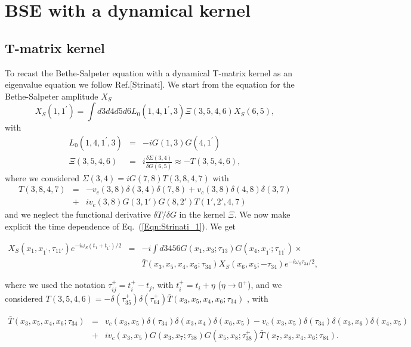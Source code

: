 \documentclass[a4paper,superscriptaddress,twocolumn,aps,prb,floatfix,citeautoscript]{revtex4-1}\usepackage[utf8]{inputenc}
\newcommand{\bea}{\begin{eqnarray}}
\newcommand{\eea}{\end{eqnarray}}
\begin{document}
\section{BSE with a dynamical  kernel}
\subsection{T-matrix kernel}
To recast the Bethe-Salpeter equation with a dynamical T-matrix kernel as an eigenvalue equation we follow Ref.[Strinati]. We start from the equation for the Bethe-Salpeter amplitude $X_S$
\begin{equation}
X_S(1,1^\prime)=\int d3d4d5d6L_0(1,4,1^\prime,3)\Xi(3,5,4,6) X_S(6,5),
\label{Eqn:Strinati_1}
\end{equation}
with 
\bea
L_0(1,4,1^\prime,3)&=&-iG(1,3)G(4,1^\prime)\\
\Xi(3,5,4,6)&=&i\frac{\delta \Sigma(3,4)}{\delta G(6,5)}\approx -T(3,5,4,6),
\label{Eqn:T-matrix_kernel}
\eea
where we considered $\Sigma(3,4)=iG(7,8)T(3,8,4,7)$  \cite{Lucia_book,pina_PRB2012}with
\bea
T(3,8,4,7) &=&-v_c(3,8)\delta(3,4)\delta(7,8)+v_c(3,8)\delta(4,8)\delta(3,7)\nonumber\\
&+&iv_c(3,8)G(3,1')G(8,2')T(1',2',4,7)
\label{Eqn:T-matrix}
\eea
and we neglect the functional derivative $\delta T/\delta G$ in the kernel $\Xi$.
We now make explicit the time dependence of Eq.\ (\ref{Eqn:Strinati_1}). We get 
\begin{widetext}
\begin{eqnarray}
  X_S(x_1,x_{1^\prime},\tau_{11'})e^{-i\omega_S(t_1+t_{1^\prime})/2}&=&-i\int d3456 G(x_1,x_3;\tau_{13})G(x_4,x_{1^\prime};\tau_{11^\prime})\times\nonumber\\
  &&\bar{T}(x_3,x_5,x_4,x_6;\tau_{34})X_S(x_6,x_5;-\tau_{34})e^{-i\omega_S\tau_{34}/2},
  \label{Eqn:DYN_T}
  \end{eqnarray}
  \end{widetext}
  where we used the notation $\tau^+_{ij}=t^+_i-t_j$, with $t^+_i=t_i+\eta$ ($\eta\rightarrow 0^+$), and we considered $T(3,5,4,6)=- \delta(\tau^+_{35})\delta(\tau^+_{64})\bar{T}(x_3,x_5,x_4,x_6;\tau_{34})$ \cite{Lucia_book}, with 
\begin{widetext}
  \begin{eqnarray}
\bar{T}(x_3,x_5,x_4,x_6;\tau_{34}) &=&v_c(x_3,x_5)\delta(\tau_{34})\delta(x_3,x_4)\delta(x_6,x_5)-v_c(x_3,x_5)\delta(\tau_{34})\delta(x_3,x_6)\delta(x_4,x_5)\nonumber\\
&+&iv_c(x_3,x_5)G(x_3,x_7;\tau_{38})G(x_5,x_8;\tau^+_{38})\bar{T}(x_7,x_8,x_4,x_6;\tau_{84}).
\label{Eqn:T_bar}
\end{eqnarray}
\end{widetext}
\end{document}
